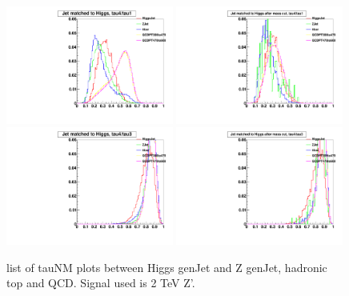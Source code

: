 \begin{figure}[h!tpb]
\begin{center}
\includegraphics[width=0.49\textwidth]{EXO-14-009/HqqqqZqqfigs/tauNM/Tau41Pre.pdf}
\includegraphics[width=0.49\textwidth]{EXO-14-009/HqqqqZqqfigs/tauNM/Tau41After.pdf}
\includegraphics[width=0.49\textwidth]{EXO-14-009/HqqqqZqqfigs/tauNM/Tau43Pre.pdf}
\includegraphics[width=0.49\textwidth]{EXO-14-009/HqqqqZqqfigs/tauNM/Tau43After.pdf}
\end{center}
\caption{
list of tauNM plots between Higgs genJet and Z genJet, hadronic top and QCD. 
Signal used is 2 TeV Z'. 
}
\label{fig:tauNM2}
\end{figure}




\clearpage
